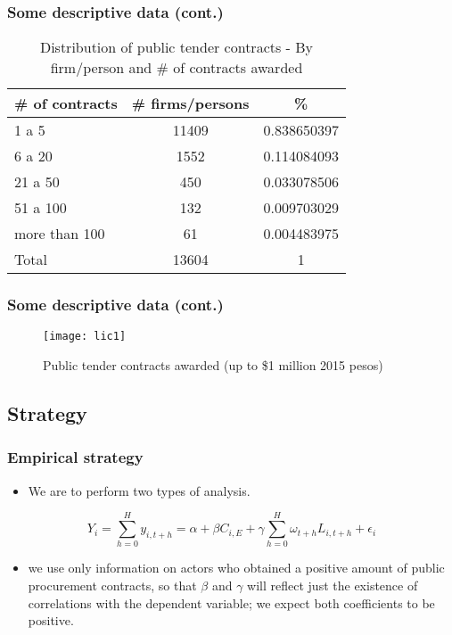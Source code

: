 \documentclass[handout,final,xcolor=dvipsnames]{beamer}
\begin{document}
      \begin{frame}\frametitle{Some descriptive data (cont.)}
\begin{table}[!htbp]
  \centering
  \caption[Distribution of # of publc tender contracts]{Distribution
    of public tender contracts - By firm/person and # of contracts
    awarded}
  \label{tab:lic1}
  \begin{tabular}[!htbp]{lcc}
    # of contracts	&	# firms/persons	&	\% 	\\\hline\hline
1 a 5	&	11409	&	0.838650397	\\
6 a 20	&	1552	&	0.114084093	\\
21 a 50	&	450	&	0.033078506	\\
51 a 100	&	132	&	0.009703029	\\
more than 100	&	61	&	0.004483975	\\\hline
Total	&	13604	&	1	\\
  \end{tabular}
\end{table}
\end{frame}



      \begin{frame}\frametitle{Some descriptive data (cont.)}
\begin{figure}[!htbp]
  \centering
 \caption{Public tender contracts awarded (up to
    \$1 million 2015 pesos)}
  \label{fig:lic1}
  \texttt{[image: lic1]}
 \end{figure}
\end{frame}



\subsection{Strategy}
      \begin{frame}\frametitle{Empirical strategy}
  \begin{itemize}\itemsep 10pt
  \item We are to perform two types of analysis. 
  \end{itemize}
  \begin{equation}
  Y_{i}=\sum_{h=0}^{H}y_{i,t+h}=\alpha+\beta C_{i,E}+\gamma
  \sum_{h=0}^{H} \omega_{t+h}L_{i,t+h}+\epsilon_{i}
\end{equation}
\begin{itemize}
\item we use only information on actors who obtained a positive
amount of public procurement contracts, so that $\beta$
and $\gamma$ will reflect just the existence of correlations with the
dependent variable; we expect both coefficients to be positive.
  \end{itemize}
\end{frame}
\end{document}
